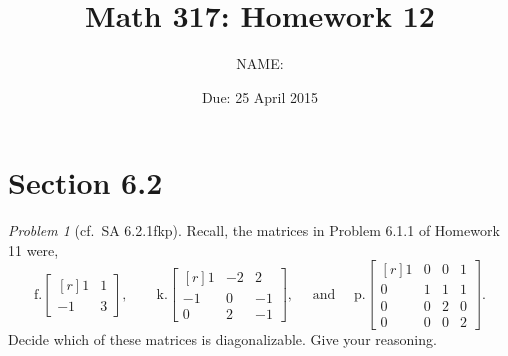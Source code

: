 \documentclass[fleqn,11pt]{paper}
\author         {NAME:                     }
\title{Math 317: Homework 12}
\date{Due: 25 April 2015}
\theoremstyle{remark}
\newtheorem{problem}{Problem}
\newtheorem*{solution}{{\bf Solution}}
\newcommand{\<}{\ensuremath{\langle}}
\renewcommand{\>}{\ensuremath{\rangle}}
\begin{document}
\maketitle


\section*{Section 6.2}
\begin{problem}[cf.~SA 6.2.1fkp]
Recall, the matrices in Problem 6.1.1 of Homework 11 were,
\[ \text{f.} \begin{bmatrix*}[r]1&1\\-1&3\end{bmatrix*}, \qquad
\text{k.} \begin{bmatrix*}[r]1&-2&2\\-1&0&-1\\0&2&-1\end{bmatrix*}, \quad \text{ and }\quad
\text{p.} \begin{bmatrix*}[r]1&0&0&1\\0&1&1&1\\0&0&2&0\\0&0&0&2\end{bmatrix*}.
\]
Decide which of these matrices is diagonalizable.  Give your reasoning.
\end{problem}
\newpage
\end{document}
